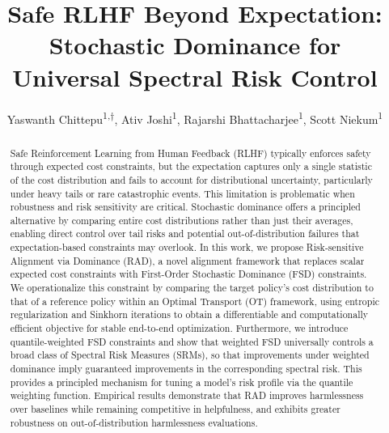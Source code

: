 \documentclass[10pt]{article} %
\title{Safe RLHF Beyond Expectation: Stochastic Dominance for Universal Spectral Risk Control}
\author{Yaswanth Chittepu\textsuperscript{1,$\dagger$}, Ativ Joshi\textsuperscript{1}, Rajarshi Bhattacharjee\textsuperscript{1}, Scott Niekum\textsuperscript{1}}
\begin{document}
\makeCover  %
\maketitle  %

\begin{abstract}

  Safe Reinforcement Learning from Human Feedback (RLHF) typically enforces safety through expected cost constraints, but the expectation captures only a single statistic of the cost distribution and fails to account for distributional uncertainty, particularly under heavy tails or rare catastrophic events. This limitation is problematic when robustness and risk sensitivity are critical. Stochastic dominance offers a principled alternative by comparing entire cost distributions rather than just their averages, enabling direct control over tail risks and potential out-of-distribution failures that expectation-based constraints may overlook. In this work, we propose Risk-sensitive Alignment via Dominance (RAD), a novel alignment framework that replaces scalar expected cost constraints with First-Order Stochastic Dominance (FSD) constraints. We operationalize this constraint by comparing the target policy's cost distribution to that of a reference policy within an Optimal Transport (OT) framework, using entropic regularization and Sinkhorn iterations to obtain a differentiable and computationally efficient objective for stable end-to-end optimization. Furthermore, we introduce quantile-weighted FSD constraints and show that weighted FSD universally controls a broad class of Spectral Risk Measures (SRMs), so that improvements under weighted dominance imply guaranteed improvements in the corresponding spectral risk. This provides a principled mechanism for tuning a model's risk profile via the quantile weighting function. Empirical results demonstrate that RAD improves harmlessness over baselines while remaining competitive in helpfulness, and exhibits greater robustness on out-of-distribution harmlessness evaluations.
  
  


\end{abstract}
\end{document}
